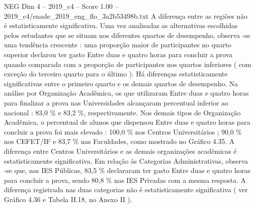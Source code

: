 \begin{textsample}{NEG Dim 4 – 2019\_c4 – Score 1.00 – 2019\_c4/enade\_2019\_eng\_flo\_3a2b53498b.txt}
A diferença entre as regiões não é estatisticamente significativa.
Uma vez analisadas as alternativas escolhidas pelos estudantes que se situam nos diferentes quartos de desempenho, observa -se uma tendência crescente : uma proporção maior de participantes no quarto superior declarou ter gasto Entre duas e quatro horas para concluir a prova quando comparada com a proporção de participantes nos quartos inferiores ( com exceção do terceiro quarto para o último ).
Há diferenças estatisticamente significativas entre o primeiro quarto e os demais quartos de desempenho.
Na análise por Organização Acadêmica, os que utilizaram Entre duas e quatro horas para finalizar a prova nas Universidades alcançaram percentual inferior ao nacional : 83,0 \% e 83,2 \%, respectivamente.
Nos demais tipos de Organização Acadêmica, o percentual de alunos que dispensou Entre duas e quatro horas para concluir a prova foi mais elevado : 100,0 \% nos Centros Universitários ; 90,0 \% nos CEFET/IF e 83,7 \% nas Faculdades, como mostrado no Gráfico 4.35.
A diferença entre Centros Universitários e as demais organizações acadêmicas é estatisticamente significativa.
Em relação às Categorias Administrativas, observa -se que, nas IES Públicas, 83,5 \% declararam ter gasto Entre duas e quatro horas para concluir a prova, sendo 80,8 \% nas IES Privadas com a mesma resposta.
A diferença registrada nas duas categorias não é estatisticamente significativa ( ver Gráfico 4.36 e Tabela II.18, no Anexo II ).

\end{textsample}
